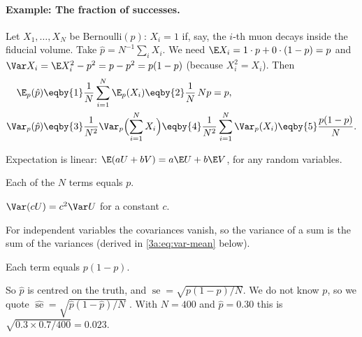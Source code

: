 \paragraph{Example: The fraction of successes.}
\label{3a:ex:bernoulli}
Let $X_1,\dots,X_N$ be Bernoulli$(p)$: $X_i=1$ if, say, the $i$-th muon
decays inside the fiducial volume. Take $\hat p=N^{-1}\sum_iX_i$. We need
$\E X_i=1\cdot p+0\cdot(1-p)=p$ and $\Var X_i=\E X_i^2-p^2=p-p^2=p(1-p)$
(because $X_i^2=X_i$). Then
\begin{align*}
  \E_p(\hat p)
  &\eqby{1} \frac1N\sum_{i=1}^N\E_p(X_i) \eqby{2} \frac1N\,Np=p ,\\
  \Var_p(\hat p)
  &\eqby{3} \frac1{N^2}\Var_p\Bigl(\sum_{i=1}^NX_i\Bigr)
   \eqby{4} \frac1{N^2}\sum_{i=1}^N\Var_p(X_i)
   \eqby{5} \frac{p(1-p)}{N}.
\end{align*}
\begin{explain}
  \item Expectation is linear: $\E(aU+bV)=a\E U+b\E V$, for any random variables.
  \item Each of the $N$ terms equals $p$.
  \item $\Var(cU)=c^2\Var U$ for a constant $c$.
  \item For independent variables the covariances vanish, so the variance of a
        sum is the sum of the variances (derived in \cref{3a:eq:var-mean} below).
  \item Each term equals $p(1-p)$.
\end{explain}
So $\hat p$ is centred on the truth, and
$\operatorname{se}=\sqrt{p(1-p)/N}$. We do not know $p$, so we quote
$\widehat{\operatorname{se}}=\sqrt{\hat p(1-\hat p)/N}$ . With $N=400$ and $\hat p=0.30$ this is
$\sqrt{0.3\times0.7/400}=0.023$.

